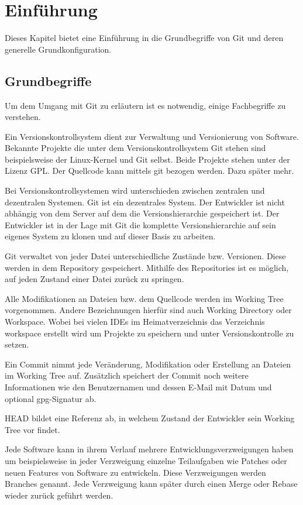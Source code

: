 \section{Einführung}
\label{sec:einfuehrung}
Dieses Kapitel bietet eine Einführung in die Grundbegriffe von Git und deren generelle Grundkonfiguration.

\subsection{Grundbegriffe}
\label{sec:einfuehrung.grundbegriffe}
Um dem Umgang mit Git zu erläutern ist es notwendig, einige Fachbegriffe zu verstehen.

Ein Versionskontrollsystem dient zur Verwaltung und Versionierung von Software. Bekannte Projekte die unter dem Versionskontrollsystem Git stehen sind beispielsweise der Linux-Kernel und Git selbst. Beide Projekte stehen unter der Lizenz GPL. Der Quellcode kann mittels git bezogen werden. Dazu später mehr.

Bei Versionskontrollsystemen wird unterschieden zwischen zentralen und dezentralen Systemen. Git ist ein dezentrales System. Der Entwickler ist nicht abhängig von dem Server auf dem die Versionshierarchie gespeichert ist. Der Entwickler ist in der Lage mit Git die komplette Versionshierarchie auf sein eigenes System zu klonen und auf dieser Basis zu arbeiten.

Git  verwaltet von jeder Datei unterschiedliche Zustände bzw. Versionen. Diese werden in dem Repository gespeichert. Mithilfe des Repositories ist es möglich, auf jeden Zustand einer Datei zurück zu springen.

Alle Modifikationen an Dateien bzw. dem Quellcode werden im Working Tree vorgenommen. Andere Bezeichnungen hierfür sind auch Working Directory oder Workspace. Wobei bei vielen IDEs im Heimatverzeichnis das Verzeichnis workspace erstellt wird um Projekte zu speichern und unter Versionskontrolle zu setzen.

Ein Commit nimmt jede Veränderung, Modifikation oder Erstellung an Dateien im Working Tree auf. Zusätzlich speichert der Commit noch weitere Informationen wie den Benutzernamen und dessen E-Mail mit Datum und optional gpg-Signatur ab.

HEAD bildet eine Referenz ab, in welchem Zustand der Entwickler sein Working Tree vor findet.

Jede Software kann in ihrem Verlauf mehrere Entwicklungsverzweigungen haben um beispielsweise in jeder Verzweigung einzelne Teilaufgaben wie Patches oder neuen Features von Software zu entwickeln. Diese Verzweigungen werden Branches genannt. Jede Verzweigung kann später durch einen Merge oder Rebase wieder zurück geführt werden.

